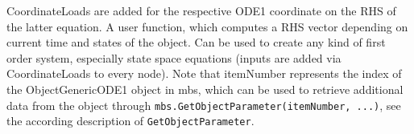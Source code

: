     CoordinateLoads are added for the respective ODE1 coordinate on the RHS of the latter equation.
    A user function, which computes a RHS vector depending on current time and states of the object. 
    Can be used to create any kind of first order system, especially state space equations (inputs are added via CoordinateLoads to every node).
    Note that itemNumber represents the index of the ObjectGenericODE1 object in mbs, which can be used to retrieve additional data from the object through
    \texttt{mbs.GetObjectParameter(itemNumber, ...)}, see the according description of \texttt{GetObjectParameter}.
    \finishTable
